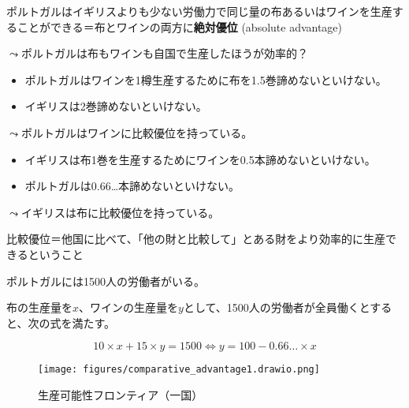 \documentclass[
  xelatex,
  ja=standard]{bxjsarticle}
\providecommand{\tightlist}{%
  \setlength{\itemsep}{0pt}\setlength{\parskip}{0pt}}\usepackage{longtable,booktabs,array}
\begin{document}
ポルトガルはイギリスよりも少ない労働力で同じ量の布あるいはワインを生産することができる＝布とワインの両方に\textbf{絶対優位}
(absolute advantage)

\(\leadsto\)ポルトガルは布もワインも自国で生産したほうが効率的？

\begin{itemize}
\tightlist
\item
  ポルトガルはワインを1樽生産するために布を1.5巻諦めないといけない。
\item
  イギリスは2巻諦めないといけない。
\end{itemize}

\(\leadsto\)ポルトガルはワインに比較優位を持っている。

\begin{itemize}
\tightlist
\item
  イギリスは布1巻を生産するためにワインを0.5本諦めないといけない。
\item
  ポルトガルは0.66\ldots 本諦めないといけない。
\end{itemize}

\(\leadsto\)イギリスは布に比較優位を持っている。

比較優位＝他国に比べて、「他の財と比較して」とある財をより効率的に生産できるということ

\begin{tcolorbox}[enhanced jigsaw, coltitle=black, breakable, opacitybacktitle=0.6, left=2mm, titlerule=0mm, arc=.35mm, colbacktitle=quarto-callout-tip-color!10!white, opacityback=0, leftrule=.75mm, title=\textcolor{quarto-callout-tip-color}{\faLightbulb}\hspace{0.5em}{イギリスとポルトガルの貿易'}, toptitle=1mm, bottomrule=.15mm, colframe=quarto-callout-tip-color-frame, toprule=.15mm, colback=white, rightrule=.15mm, bottomtitle=1mm]

ポルトガルには1500人の労働者がいる。

\end{tcolorbox}

布の生産量を\(x\)、ワインの生産量を\(y\)として、1500人の労働者が全員働くとすると、次の式を満たす。

\[
10 \times x + 15 \times y = 1500
\Leftrightarrow y = 100 - 0.66 \dots \times x
\]

\begin{figure}[htpb]

{\centering \texttt{[image: figures/comparative\_advantage1.drawio.png]}

}

\caption{生産可能性フロンティア（一国）}

\end{figure}
\end{document}
